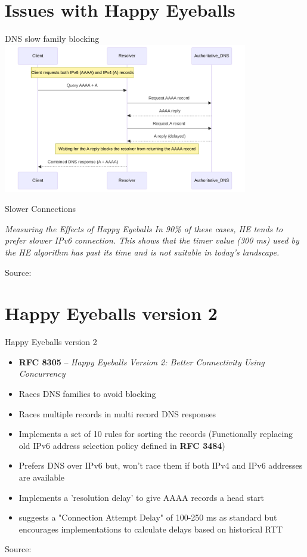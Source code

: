 \documentclass[aspectratio=169]{beamer}
\begin{document}
\section{Issues with Happy Eyeballs}
\begin{frame}{DNS slow family blocking}
  \centering
  \includegraphics[width=0.8\textwidth]{sfblocking.pdf}
\end{frame}

\begin{frame}{Slower Connections}
\begin{block}{\textit{Measuring the Effects of Happy Eyeballs}}
\vspace{0.5em}
\textit{In 90\% of these cases, HE
tends to prefer slower IPv6 connection. This shows that the timer
value (300 ms) used by the HE algorithm has past its time and is
not suitable in today’s landscape.}
\end{block}
  \centering
  {\tiny Source: }
\end{frame}

\section{Happy Eyeballs version 2}
\begin{frame}{Happy Eyeballs version 2}
  \begin{itemize}
    \item \textbf{RFC 8305} – \emph{Happy Eyeballs Version 2: Better Connectivity Using Concurrency}
    \item Races DNS families to avoid blocking
    \item Races multiple records in multi record DNS responses
    \item Implements a set of 10 rules for sorting the records (Functionally replacing old IPv6 address selection policy defined in \textbf{RFC 3484})
    \item Prefers DNS over IPv6 but, won't race them if both IPv4 and IPv6 addresses are available
    \item Implements a 'resolution delay' to give AAAA records a head start
    \item suggests a "Connection Attempt Delay" of 100-250 ms as standard but encourages implementations to calculate delays based on historical RTT
  \end{itemize}
  \centering
  {\tiny Source: }
\end{frame}
\end{document}
